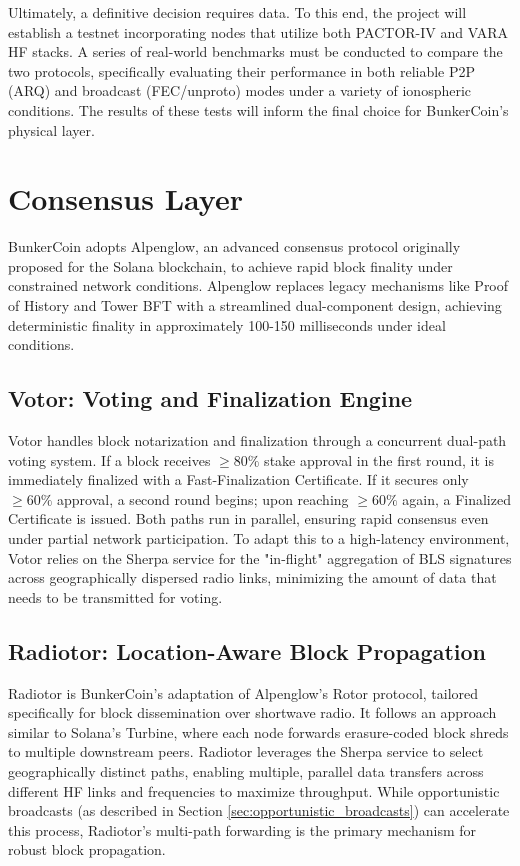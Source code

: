 \documentclass{article}
\begin{document}
Ultimately, a definitive decision requires data. To this end, the project will establish a testnet incorporating nodes that utilize both PACTOR-IV and VARA HF stacks. A series of real-world benchmarks must be conducted to compare the two protocols, specifically evaluating their performance in both reliable P2P (ARQ) and broadcast (FEC/unproto) modes under a variety of ionospheric conditions. The results of these tests will inform the final choice for BunkerCoin's physical layer.

\section{Consensus Layer}
\label{sec:consensus}

BunkerCoin adopts Alpenglow, an advanced consensus protocol originally proposed for the Solana blockchain, to achieve rapid block finality under constrained network conditions. Alpenglow replaces legacy mechanisms like Proof of History and Tower BFT with a streamlined dual-component design, achieving deterministic finality in approximately 100-150 milliseconds under ideal conditions.

\subsection{Votor: Voting and Finalization Engine}

Votor handles block notarization and finalization through a concurrent dual-path voting system. If a block receives $\geq 80\%$ stake approval in the first round, it is immediately finalized with a Fast-Finalization Certificate. If it secures only $\geq 60\%$ approval, a second round begins; upon reaching $\geq 60\%$ again, a Finalized Certificate is issued. Both paths run in parallel, ensuring rapid consensus even under partial network participation. To adapt this to a high-latency environment, Votor relies on the Sherpa service for the "in-flight" aggregation of BLS signatures across geographically dispersed radio links, minimizing the amount of data that needs to be transmitted for voting.

\subsection{Radiotor: Location-Aware Block Propagation}

Radiotor is BunkerCoin's adaptation of Alpenglow's Rotor protocol, tailored specifically for block dissemination over shortwave radio. It follows an approach similar to Solana's Turbine, where each node forwards erasure-coded block shreds to multiple downstream peers. Radiotor leverages the Sherpa service to select geographically distinct paths, enabling multiple, parallel data transfers across different HF links and frequencies to maximize throughput. While opportunistic broadcasts (as described in Section \ref{sec:opportunistic_broadcasts}) can accelerate this process, Radiotor's multi-path forwarding is the primary mechanism for robust block propagation.
\end{document}
